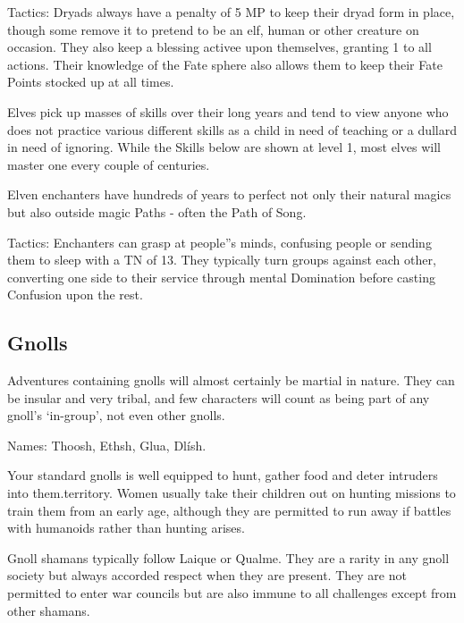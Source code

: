 Tactics: Dryads always have a penalty of 5 MP to keep their dryad form in place, though some remove it to pretend to be an elf, human or other creature on occasion.  They also keep a blessing activee upon themselves, granting 1 to all actions.  Their knowledge of the Fate sphere also allows them to keep their Fate Points stocked up at all times.

\label{elf}
\elf

Elves pick up masses of skills over their long years and tend to view anyone who does not practice various different skills as a child in need of teaching or a dullard in need of ignoring.  While the Skills below are shown at level 1, most elves will master one every couple of centuries.

\label{elven_enchanter}
\elvenenchanter

Elven enchanters have hundreds of years to perfect not only their natural magics but also outside magic Paths - often the Path of Song.

	Tactics: Enchanters can grasp at people''s minds, confusing people or sending them to sleep with a TN of 13.  They typically turn groups against each other, converting one side to their service through mental Domination before casting Confusion upon the rest.

\subsection{Gnolls}

Adventures containing gnolls will almost certainly be martial in nature.  They can be insular and very tribal, and few characters will count as being part of any gnoll's `in-group', not even other gnolls.

	Names: Thoosh, Ethsh, Glua, Dl\'{i}sh.

\label{gnoll_hunter}
\gnollhunter

Your standard gnolls is well equipped to hunt, gather food and deter intruders into them.territory.  Women usually take their children out on hunting missions to train them from an early age, although they are permitted to run away if battles with humanoids rather than hunting arises.

\label{gnoll_shaman}
\gnollshaman 

Gnoll shamans typically follow Laique or Qualme.  They are a rarity in any gnoll society but always accorded respect when they are present.  They are not permitted to enter war councils but are also immune to all challenges except from other shamans.

